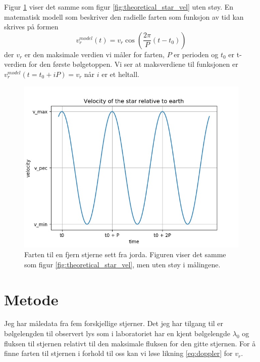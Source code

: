 \documentclass[english,notitlepage]{revtex4-1}  %
\begin{document}
Figur \ref{fig:theoretical_star_vel_nonoise} viser det samme som figur
 \ref{fig:theoretical_star_vel} uten støy. En matematisk modell som beskriver den radielle farten som funksjon av tid kan skrives på formen
 \begin{equation}
   \label{eq:v_model}
   v_r^{model} (t) = v_r \cos{\left( \frac{2 \pi}{P} (t - t_0) \right)}
 \end{equation}
 der $v_r$ er den maksimale verdien vi måler for farten, $P$ er perioden og $t_0$ er t-verdien for den første bølgetoppen. Vi ser at maksverdiene til funksjonen er $v_r^{model} (t = t_0 + iP) = v_r$ når $i$ er et heltall.

\begin{figure}
  \includegraphics[width=\linewidth]{../output/plots/theoretical_star_vel_nonoise.jpg}
  \caption{Farten til en fjern stjerne sett fra jorda. Figuren viser det samme som figur \ref{fig:theoretical_star_vel}, men uten støy i målingene.}
  \label{fig:theoretical_star_vel_nonoise}
\end{figure}



\section{Metode}

Jeg har måledata fra fem forskjellige stjerner. Det jeg har tilgang til er bølgelengden
 til observert lys som i laboratoriet har en kjent bølgelengde $\lambda_0$ og fluksen til stjernen relativt til den maksimale fluksen for den gitte stjernen. For å finne farten til stjernen i forhold til oss kan vi løse likning \ref{eq:doppler} for $v_r$.
\end{document}

